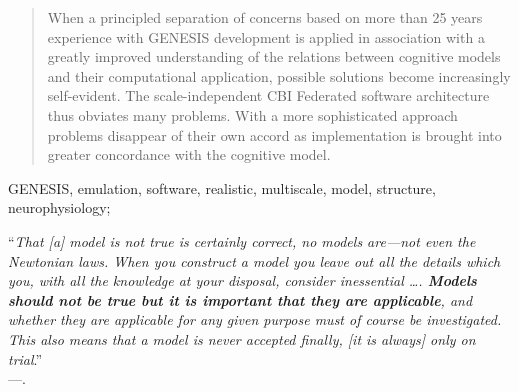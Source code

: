 \documentclass[11pt,3p,twocolumn]{JMN}
\begin{document}
\begin{frontmatter}
\begin{abstract}
When a principled separation of concerns based on more than 25 years experience with  GENESIS development is applied in association with a greatly improved understanding of the relations between cognitive models and their computational application, possible solutions become increasingly self-evident. The scale-independent CBI Federated software architecture thus obviates many problems. With a more sophisticated approach problems disappear of their own accord as implementation is brought into greater concordance with the cognitive model.
\end{abstract}

\begin{keyword}
 GENESIS, emulation, software, realistic, multiscale, model, structure, neurophysiology;

\vspace*{1\baselineskip}
\hspace*{0.05\textwidth}\begin{minipage}{0.9\textwidth}

\noindent ``\small{\textit{That \textnormal{[a]} model is not true is certainly correct, no models are—not even the Newtonian laws. When you construct a model you leave out all the details which you, with all the knowledge at your disposal, consider inessential \ldots. \textbf{Models should not be true but it is important that they are applicable}, and whether they are applicable for any given purpose must of course be investigated. This also means that a model is never accepted finally, \textnormal{[it is always]} only on trial}.}''\\
---\citet[pp.\,37--38]{rasch80}.\\
\end{minipage}

\end{keyword}

\end{frontmatter}

\end{document}
